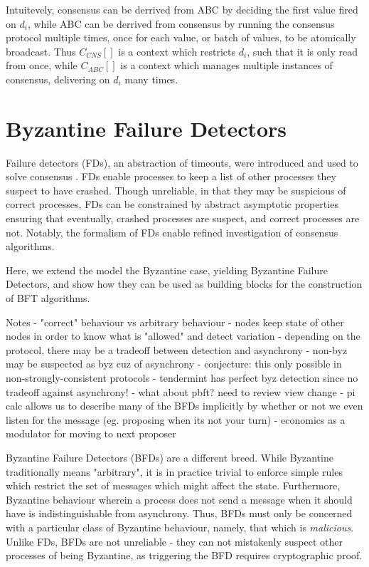 Intuitevely, consensus can be derrived from ABC by deciding the first value fired on $d_i$,
while ABC can be derrived from consensus by running the consensus protocol multiple times,
once for each value, or batch of values, to be atomically broadcast.
Thus $ C_{CNS}[ ] $ is a context which restricts $d_i$, such that it is only read from once,
while $ C_{ABC}[ ] $ is a context which manages multiple instances of consensus, delivering on $d_i$ many times.


\section{Byzantine Failure Detectors}
Failure detectors (FDs), an abstraction of timeouts,
were introduced and used to solve consensus \cite{chandra1996unreliable}.
FDs enable processes to keep a list of other processes they suspect to have crashed.
Though unreliable, in that they may be suspicious of correct processes,
FDs can be constrained by abstract asymptotic properties ensuring that 
eventually, crashed processes are suspect, and correct processes are not.
Notably, the formalism of FDs enable refined investigation of consensus algorithms.

Here, we extend the model the Byzantine case, yielding Byzantine Failure Detectors,
and show how they can be used as building blocks for the construction of BFT algorithms.


Notes
- "correct" behaviour vs arbitrary behaviour
- nodes keep state of other nodes in order to know what is "allowed" and detect variation
- depending on the protocol, there may be a tradeoff between detection and asynchrony
	- non-byz may be suspected as byz cuz of asynchrony
	- conjecture: this only possible in non-strongly-consistent protocols
- tendermint has perfect byz detection since no tradeoff against asynchrony!
- what about pbft? need to review view change
- pi calc allows us to describe many of the BFDs implicitly by whether or not
we even listen for the message (eg. proposing when its not your turn)
- economics as a modulator for moving to next proposer





Byzantine Failure Detectors (BFDs) are a different breed.
While Byzantine traditionally means "arbitrary", 
it is in practice trivial to enforce simple rules which restrict
the set of messages which might affect the state.
Furthermore, Byzantine behaviour wherein a process does not send a message when it should have 
is indistinguishable from asynchrony.
Thus, BFDs must only be concerned with a particular class of Byzantine behaviour,
namely, that which is \emph{malicious}.
Unlike FDs, BFDs are not unreliable - they can not mistakenly suspect other processes
of being Byzantine, as triggering the BFD requires cryptographic proof.


